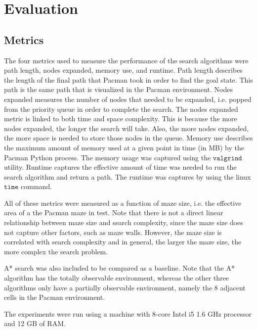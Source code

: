 

\section{Evaluation}\label{sec:eval}
	\subsection{Metrics}
    The four metrics used to measure the performance of the search algorithms were path length, nodes expanded, memory use, and runtime. Path length describes the length of the final path that Pacman took in order to find the goal state. This path is the same path that is visualized in the Pacman environment. Nodes expanded measures the number of nodes that needed to be expanded, i.e. popped from the priority queue in order to complete the search. The nodes expanded metric is linked to both time and space complexity. This is because the more nodes expanded, the longer the search will take. Also, the more nodes expanded, the more space is needed to store those nodes in the queue. Memory use describes the maximum amount of memory used at a given point in time (in MB) by the Pacman Python process. The memory usage was  captured using the $\texttt{valgrind}$ utility. Runtime captures the effective amount of time was needed to run the search algorithm and return a path. The runtime was captures by using the linux $\texttt{time}$ command. 
    
    All of these metrics were measured as a function of maze size, i.e. the effective area of a the Pacman maze in test. Note that there is not a direct linear relationship between maze size and search complexity, since the maze size does not capture other factors, such as maze walls. However, the maze size is correlated with search complexity and in general, the larger the maze size, the more complex the search problem.
    
    A* search was also included to be compared as a baseline. Note that the A* algorithm has the totally observable environment, whereas the other three algorithms only have a partially observable environment, namely the 8 adjacent cells in the Pacman environment.
    
    The experiments were run using a machine with 8-core Intel i5 1.6 GHz processor and 12 GB of RAM. 
    
